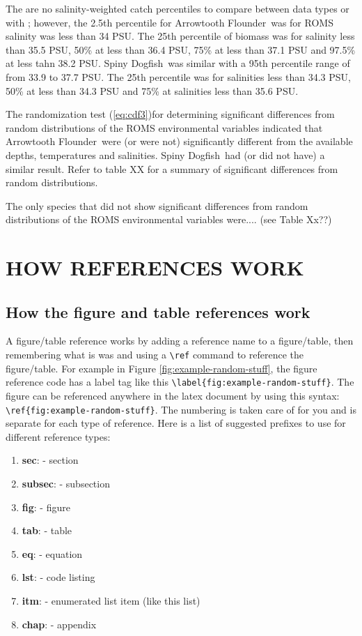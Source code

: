 \documentclass[11pt]{book}\usepackage[]{graphicx}\usepackage[]{color}
\newcommand{\fishnameARF}{Arrowtooth Flounder}
\newcommand{\fishnameDOG}{Spiny Dogfish}
\begin{document}
The are no salinity-weighted catch percentiles to compare between data types or with \citet{psf94}; however, the 2.5th percentile for \fishnameARF\ was for ROMS salinity was less than 34 PSU. The 25th percentile of biomass was for salinity less than 35.5 PSU, 50\% at less than 36.4 PSU, 75\% at less than 37.1 PSU and 97.5\% at less tahn 38.2 PSU. \fishnameDOG\ was similar with a 95th percentile range of from 33.9 to 37.7 PSU. The 25th percentile was for salinities less than 34.3 PSU, 50\% at less than 34.3 PSU and 75\% at salinities less than 35.6 PSU. 

The randomization test (\ref{eq:cdf3})for determining significant differences from random distributions of the ROMS environmental variables indicated that \fishnameARF\ were (or were not) significantly different from the available depths, temperatures and salinities. \fishnameDOG\ had (or did not have) a similar result. Refer to table XX for a summary of significant differences from random distributions.

The only species that did not show significant differences from random distributions of the ROMS environmental variables were.... (see Table Xx??)

\bigskip
\section{HOW REFERENCES WORK} \label{sec:how.refs.work}

\subsection{How the figure and table references work} \label{subsec:how.figure.refs.work}

A figure/table reference works by adding a reference name to a figure/table, then remembering what is was and using a \verb!\ref! command to reference the figure/table. For example in Figure \ref{fig:example-random-stuff}, the figure reference code has a label tag like this \verb!\label{fig:example-random-stuff}!. The figure can be referenced anywhere in the latex document by using this syntax: \verb!\ref{fig:example-random-stuff}!. The numbering is taken care of for you and is separate for each type of reference. Here is a list of suggested prefixes to use for different reference types:

\begin{enumerate}
  \item    \textbf{sec}: - section
  \item \textbf{subsec}: - subsection
  \item    \textbf{fig}: - figure
  \item    \textbf{tab}: - table
  \item     \textbf{eq}: - equation
  \item    \textbf{lst}: - code listing
  \item    \textbf{itm}: - enumerated list item (like this list)
  \item   \textbf{chap}: - appendix
\end{enumerate}
\end{document}
